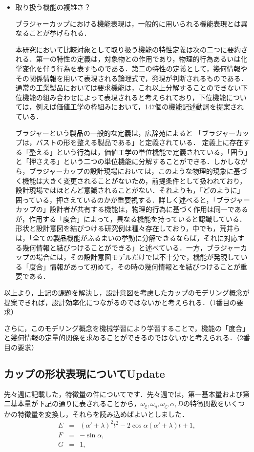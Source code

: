 \documentclass[11pt]{jsarticle}
\begin{document}
\begin{itemize}
				\item 取り扱う機能の複雑さ？
				
				ブラジャーカップにおける機能表現は，一般的に用いられる機能表現とは異なることが挙げられる．
				
				本研究において比較対象として取り扱う機能の特性定義は次の二つに要約される．第一の特性の定義は，対象物との作用であり，物理的行為あるいは化学変化を伴う行為を表すものである．第二の特性の定義として，幾何情報やその関係情報を用いて表現される論理式で，発現が判断されるものである．
				通常の工業製品においては要求機能は，これ以上分解することのできない下位機能の組み合わせによって表現されると考えられており，下位機能については，例えば価値工学の枠組みにおいて，147個の機能記述動詞を提案されている．
				
				ブラジャーという製品の一般的な定義は，広辞苑によると
				「ブラジャーカップは，バストの形を整える製品である」と定義されている．
				定義上に存在する「整える」という行為は，価値工学の単位機能で定義されている，「囲う」と「押さえる」という二つの単位機能に分解することができる．しかしながら，ブラジャーカップの設計現場においては，このような物理的現象に基づく機能は大きく変更されることがないため，前提条件として扱われており，設計現場ではほとんど意識されることがない．それよりも，「どのように」囲っている，押さえているのかが重要視する．詳しく述べると，「ブラジャーカップの」設計者が共有する機能は，物理的行為に基づく作用は同一であるが，作用する「度合」によって，異なる機能を持っていると認識している．形状と設計意図を結びつける研究例は種々存在しており，中でも，荒井らは，「全ての製品機能がふるまいの挙動に分解できるならば，それに対応する幾何情報と結びつけることができる」と述べている．一方，ブラジャーカップの場合には，その設計意図モデルだけでは不十分で，機能が発現している「度合」情報があって初めて，その時の幾何情報とを結びつけることが重要である．
			\end{itemize}
		以上より，上記の課題を解決し，設計意図を考慮したカップのモデリング概念が提案できれば，設計効率化につながるのではないかと考えられる．（1番目の要求）
		
		さらに，このモデリング概念を機械学習により学習することで，機能の「度合」と幾何情報の定量的関係を求めることができるのではないかと考えられる．（2番目の要求）
		\subsection{カップの形状表現についてUpdate}
			先々週に記載した，特徴量の件についてです．先々週では，第一基本量および第二基本量が下記の通りに表されることから，$ \omega_{\xi},\omega_{\eta},\omega_{\zeta},\alpha ,D$の特徴関数をいくつかの特徴量を変換し，それらを読み込めばよいとしました．
			\begin{eqnarray}
			E &=& (\alpha'+\lambda)^2 t^2 -2\cos \alpha(\alpha'+\lambda) t + 1,\\
			F &=& -\sin \alpha,\\
			G &=& 1,
			\end{eqnarray}
			
\end{document}
